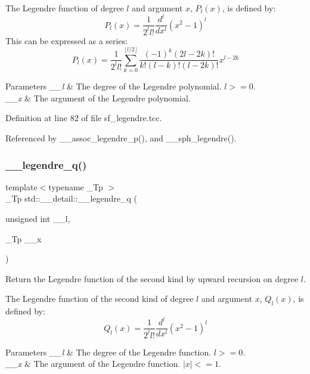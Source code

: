 The Legendre function of degree $ l $ and argument $ x $, $ P_l(x) $, is defined by\+: \[ P_l(x) = \frac{1}{2^l l!}\frac{d^l}{dx^l}(x^2 - 1)^{l} \] This can be expressed as a series\+: \[ P_l(x) = \frac{1}{2^l l!}\sum_{k=0}^{\lfloor l/2 \rfloor} \frac{(-1)^k(2l-2k)!}{k!(l-k)!(l-2k)!}x^{l-2k} \]


\begin{DoxyParams}{Parameters}
{\em \+\_\+\+\_\+l} & The degree of the Legendre polynomial. $ l >= 0 $. \\
\hline
{\em \+\_\+\+\_\+x} & The argument of the Legendre polynomial. \\
\hline
\end{DoxyParams}


Definition at line 82 of file sf\+\_\+legendre.\+tcc.



Referenced by \+\_\+\+\_\+assoc\+\_\+legendre\+\_\+p(), and \+\_\+\+\_\+sph\+\_\+legendre().

\mbox{\label{namespacestd_1_1____detail_a0643760e0d1701df4db880b2ad969055}} 
\subsubsection{\texorpdfstring{\+\_\+\+\_\+legendre\+\_\+q()}{\_\_legendre\_q()}}
{\footnotesize\ttfamily template$<$typename \+\_\+\+Tp $>$ \\
\+\_\+\+Tp std\+::\+\_\+\+\_\+detail\+::\+\_\+\+\_\+legendre\+\_\+q (\begin{DoxyParamCaption}\item[{unsigned int}]{\+\_\+\+\_\+l,  }\item[{\+\_\+\+Tp}]{\+\_\+\+\_\+x }\end{DoxyParamCaption})}



Return the Legendre function of the second kind by upward recursion on degree $ l $. 

The Legendre function of the second kind of degree $ l $ and argument $ x $, $ Q_l(x) $, is defined by\+: \[ Q_l(x) = \frac{1}{2^l l!}\frac{d^l}{dx^l}(x^2 - 1)^{l} \]


\begin{DoxyParams}{Parameters}
{\em \+\_\+\+\_\+l} & The degree of the Legendre function. $l >= 0$. \\
\hline
{\em \+\_\+\+\_\+x} & The argument of the Legendre function. $|x| <= 1$. \\
\hline
\end{DoxyParams}


